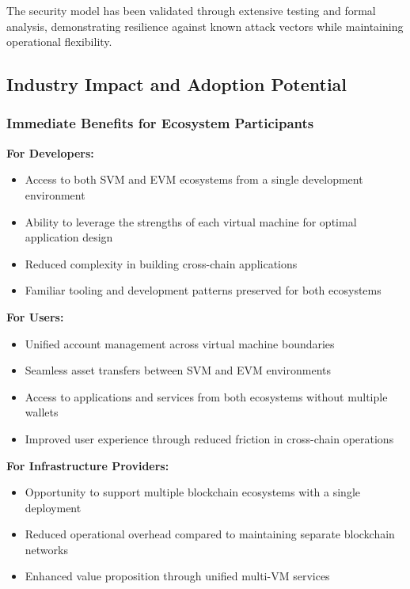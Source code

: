 \documentclass[11pt,a4paper]{article}
\begin{document}
The security model has been validated through extensive testing and formal analysis, demonstrating resilience against known attack vectors while maintaining operational flexibility.

\subsection{Industry Impact and Adoption Potential}

\subsubsection{Immediate Benefits for Ecosystem Participants}

\textbf{For Developers:}
\begin{itemize}
    \item Access to both SVM and EVM ecosystems from a single development environment
    \item Ability to leverage the strengths of each virtual machine for optimal application design
    \item Reduced complexity in building cross-chain applications
    \item Familiar tooling and development patterns preserved for both ecosystems
\end{itemize}

\textbf{For Users:}
\begin{itemize}
    \item Unified account management across virtual machine boundaries
    \item Seamless asset transfers between SVM and EVM environments
    \item Access to applications and services from both ecosystems without multiple wallets
    \item Improved user experience through reduced friction in cross-chain operations
\end{itemize}

\textbf{For Infrastructure Providers:}
\begin{itemize}
    \item Opportunity to support multiple blockchain ecosystems with a single deployment
    \item Reduced operational overhead compared to maintaining separate blockchain networks
    \item Enhanced value proposition through unified multi-VM services
\end{itemize}
\end{document}
